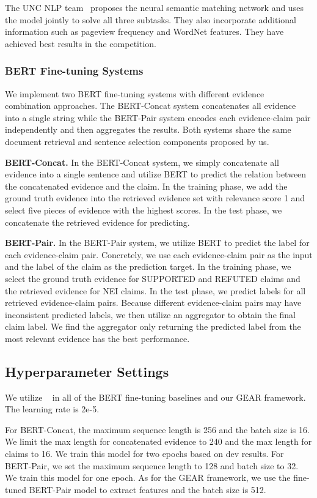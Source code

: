 \documentclass[11pt,a4paper]{article}
\begin{document}
The UNC NLP team~\cite{nie2018combining} proposes the neural semantic matching network and uses the model jointly to solve all three subtasks. They also incorporate additional information such as pageview frequency and WordNet features. They have achieved best results in the competition.

\subsubsection*{BERT Fine-tuning Systems} 
We implement two BERT fine-tuning systems with different evidence combination approaches. The BERT-Concat system concatenates all evidence into a single string while the BERT-Pair system encodes each evidence-claim pair independently and then aggregates the results. Both systems share the same document retrieval and sentence selection components proposed by us.

\textbf{BERT-Concat.} In the BERT-Concat system, we simply concatenate all evidence into a single sentence and utilize BERT to predict the relation between the concatenated evidence and the claim. In the training phase, we add the ground truth evidence into the retrieved evidence set with relevance score 1 and select five pieces of evidence with the highest scores. In the test phase, we concatenate the retrieved evidence for predicting.

\textbf{BERT-Pair.} In the BERT-Pair system, we utilize BERT to predict the label for each evidence-claim pair. Concretely, we use each evidence-claim pair as the input and the label of the claim as the prediction target. 
In the training phase, we select the ground truth evidence for SUPPORTED and REFUTED claims and the retrieved evidence for NEI claims. In the test phase, we predict labels for all retrieved evidence-claim pairs.
Because different evidence-claim pairs may have inconsistent predicted labels, we then utilize an aggregator to obtain the final claim label. We find the aggregator only returning the predicted label from the most relevant evidence has the best performance. 

\subsection{Hyperparameter Settings}
We utilize ~\cite{devlin2018bert} in all of the BERT fine-tuning baselines and our GEAR framework. The learning rate is 2e-5.

For BERT-Concat, the maximum sequence length is 256 and the batch size is 16. We limit the max length for concatenated evidence to 240 and the max length for claims to 16. We train this model for two epochs based on dev results.
For BERT-Pair, we set the maximum sequence length to 128 and batch size to 32. We train this model for one epoch.
As for the GEAR framework, we use the fine-tuned BERT-Pair model to extract features and the batch size is 512.
\end{document}
